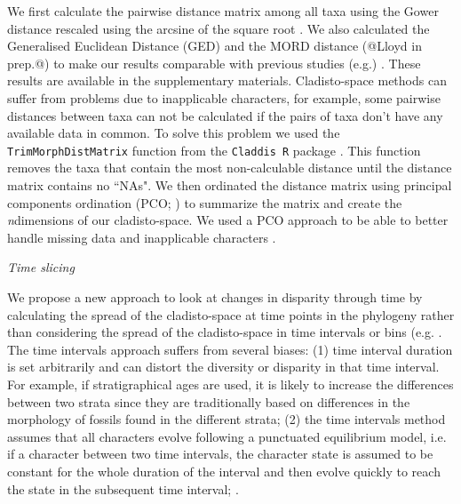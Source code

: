 \documentclass[12pt,letterpaper]{article}
\renewcommand{\subsection}[1]{%
\bigskip
\begin{center}
\begin{large}
\normalfont\itshape #1
\end{large}
\end{center}}
\begin{document}
We first calculate the pairwise distance matrix among all taxa using the Gower distance \cite{Gower71} rescaled using the arcsine of the square root \cite{Claddis}. 
We also calculated the Generalised Euclidean Distance (GED) \cite{Wills2001} and the MORD distance (@Lloyd in prep.@) to make our results comparable with previous studies (e.g.) 
. These results are available in the supplementary materials. %
Cladisto-space methods can suffer from problems due to inapplicable characters, for example, some pairwise distances between taxa can not be calculated if the pairs of taxa don't have any available data in common. To solve this problem we used the \texttt{TrimMorphDistMatrix} function from the \texttt{Claddis R} package \cite{Claddis}. This function removes the taxa that contain the most non-calculable distance until the distance matrix contains no ``NAs". 
We then ordinated the distance matrix using principal components ordination
(PCO; \cite{GOWER01121966}) to summarize the matrix and create the \textit{n}dimensions of our cladisto-space. We used a PCO approach to be able to better handle missing data and inapplicable characters \cite{lofgren2003,Wesley-Hunt2005}.

\subsection{Time slicing} %
We propose a new approach to look at changes in disparity
through time by calculating the spread of the cladisto-space at time points in the phylogeny rather than considering the spread of the cladisto-space in time intervals or bins (e.g. \cite{Brusatte12092008,brusattedinosaur2012,toljagictriassic-jurassic2013}. The time intervals approach suffers from several biases: (1) time interval duration is set arbitrarily and can distort the diversity or disparity in that time interval. For example, if stratigraphical ages are used, it is likely to increase the differences between two strata since they are traditionally based on differences in the morphology of fossils found in the different strata; (2) the time intervals method assumes that all characters evolve following a punctuated equilibrium model, i.e. if a character 
between two time intervals, the character state is assumed to be constant for the whole duration of the interval and then evolve quickly to reach the state in the subsequent time interval; \cite{Gould1977}. %
\end{document}
